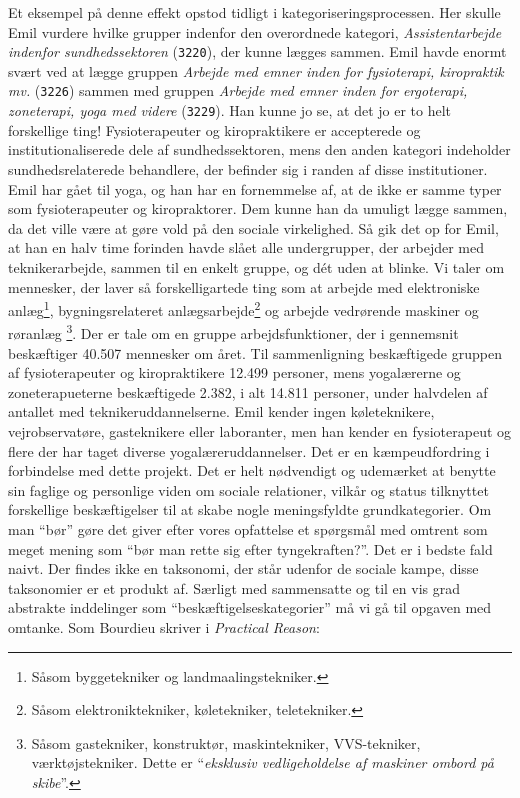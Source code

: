 Et eksempel på denne effekt opstod tidligt i kategoriseringsprocessen. Her skulle Emil vurdere hvilke grupper indenfor den overordnede kategori, \emph{Assistentarbejde indenfor sundhedssektoren} (\texttt{3220}), der kunne lægges sammen. Emil havde enormt svært ved at lægge gruppen \emph{Arbejde med emner inden for fysioterapi, kiropraktik mv.} (\texttt{3226}) sammen med gruppen \emph{Arbejde med emner inden for ergoterapi, zoneterapi, yoga med videre} (\texttt{3229}). Han kunne jo se, at det jo er to helt forskellige ting! Fysioterapeuter og kiropraktikere er accepterede og institutionaliserede dele af sundhedssektoren, mens den anden kategori indeholder sundhedsrelaterede behandlere, der befinder sig i randen af disse institutioner. Emil har gået til yoga, og han har en fornemmelse af, at de ikke er samme typer som fysioterapeuter og kiropraktorer. Dem kunne han da umuligt lægge sammen, da det ville være at gøre vold på den sociale virkelighed. Så gik det op for Emil, at han en halv time forinden havde slået alle undergrupper, der arbejder med teknikerarbejde, sammen til en enkelt gruppe, og dét uden at blinke. Vi taler om mennesker, der laver så forskelligartede ting som at arbejde med elektroniske anlæg\footnote{Såsom byggetekniker og landmaalingstekniker.}, bygningsrelateret anlægsarbejde\footnote{Såsom elektroniktekniker, køletekniker, teletekniker.} og arbejde vedrørende maskiner og røranlæg \footnote{Såsom gastekniker, konstruktør, maskintekniker, VVS-tekniker, værktøjstekniker. Dette er “\emph{eksklusiv vedligeholdelse af maskiner ombord på skibe}”.}. Der er tale om en gruppe arbejdsfunktioner, der i gennemsnit beskæftiger 40.507 mennesker om året. Til sammenligning beskæftigede gruppen af fysioterapeuter og kiropraktikere 12.499 personer, mens yogalærerne og zoneterapueterne beskæftigede 2.382, i alt 14.811 personer, under halvdelen af antallet med teknikeruddannelserne. Emil kender ingen køleteknikere, vejrobservatøre, gasteknikere eller laboranter, men han kender en fysioterapeut og flere der har taget diverse yogalæreruddannelser. Det er en kæmpeudfordring i forbindelse med dette projekt. Det er helt nødvendigt og udemærket at benytte sin faglige og personlige viden om sociale relationer, vilkår og status tilknyttet forskellige beskæftigelser til at skabe nogle meningsfyldte grundkategorier. Om man “bør” gøre det giver efter vores opfattelse et spørgsmål med omtrent som meget mening som “bør man rette sig efter tyngekraften?”. Det er i bedste fald naivt. Der findes ikke en taksonomi, der står udenfor de sociale kampe, disse taksonomier er et produkt af. Særligt med sammensatte og til en vis grad abstrakte inddelinger som “beskæftigelseskategorier” må vi gå til opgaven med omtanke. Som Bourdieu skriver i \emph{Practical Reason}:

